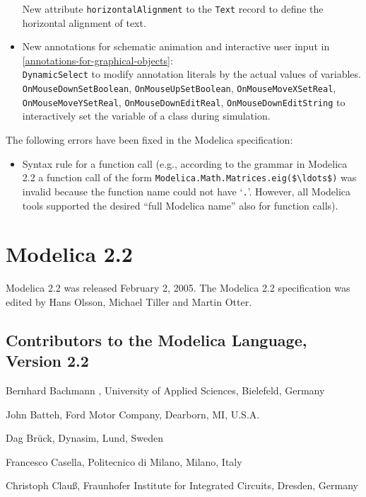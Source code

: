 \begin{itemize}
  New attribute \lstinline!horizontalAlignment! to the \lstinline!Text! record to define the horizontal alignment of text.
\item
  New annotations for schematic animation and interactive user input in
  \cref{annotations-for-graphical-objects}:\\
  \lstinline!DynamicSelect! to modify annotation literals by the actual values of variables.\\
  \lstinline!OnMouseDownSetBoolean!, \lstinline!OnMouseUpSetBoolean!, \lstinline!OnMouseMoveXSetReal!,
  \lstinline!OnMouseMoveYSetReal!, \lstinline!OnMouseDownEditReal!, \lstinline!OnMouseDownEditString! to
  interactively set the variable of a class during simulation.
\end{itemize}

The following errors have been fixed in the Modelica specification:
\begin{itemize}
\item
  Syntax rule for a function call (e.g., according to the grammar in
  Modelica 2.2 a function call of the form
  \lstinline!Modelica.Math.Matrices.eig($\ldots$)! was invalid because the function name
  could not have `\lstinline!.!'. However, all Modelica tools supported the
  desired ``full Modelica name'' also for function calls).
\end{itemize}

\section{Modelica 2.2}\label{modelica-2-2}

Modelica 2.2 was released February 2, 2005. The Modelica 2.2
specification was edited by Hans Olsson, Michael Tiller and Martin
Otter.

\subsection{Contributors to the Modelica Language, Version 2.2}\label{contributors-to-the-modelica-language-version-2-2}
\indent\indent
Bernhard Bachmann , University of Applied Sciences, Bielefeld, Germany

John Batteh, Ford Motor Company, Dearborn, MI, U.S.A.

Dag Brück, Dynasim, Lund, Sweden

Francesco Casella, Politecnico di Milano, Milano, Italy

Christoph Clauß, Fraunhofer Institute for Integrated Circuits, Dresden,
Germany

